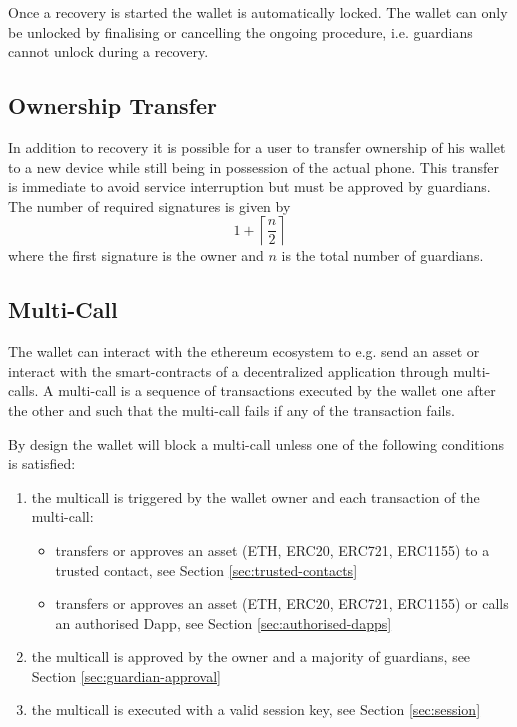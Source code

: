 \documentclass[12pt]{article}
\begin{document}
Once a recovery is started the wallet is automatically locked. The wallet can only be unlocked by finalising or cancelling the ongoing procedure, i.e. guardians cannot unlock during a recovery.

\subsection{Ownership Transfer}

In addition to recovery it is possible for a user to transfer ownership of his wallet to a new device while still being in possession of the actual phone. This transfer is immediate to avoid service interruption but must be approved by guardians. The number of required signatures is given by
\begin{equation*}
    1+\left\lceil {\frac{n}{2}} \right\rceil
\end{equation*}
where the first signature is the owner and $n$ is the total number of guardians.

\subsection{Multi-Call}

The wallet can interact with the ethereum ecosystem to e.g. send an asset or interact with the smart-contracts of a decentralized application through multi-calls. A multi-call is a sequence of transactions executed by the wallet one after the other and such that the multi-call fails if any of the transaction fails.

By design the wallet will block a multi-call unless one of the following conditions is satisfied:
\begin{enumerate}
    \item the multicall is triggered by the wallet owner and each transaction of the multi-call:
    \begin{itemize}
        \item transfers or approves an asset (ETH, ERC20, ERC721, ERC1155) to a trusted contact, see Section \ref{sec:trusted-contacts}
        \item transfers or approves an asset (ETH, ERC20, ERC721, ERC1155) or calls an authorised Dapp, see Section \ref{sec:authorised-dapps}
    \end{itemize}
    \item the multicall is approved by the owner and a majority of guardians, see Section \ref{sec:guardian-approval} 
    \item the multicall is executed with a valid session key, see Section \ref{sec:session}
\end{enumerate}
\end{document}
